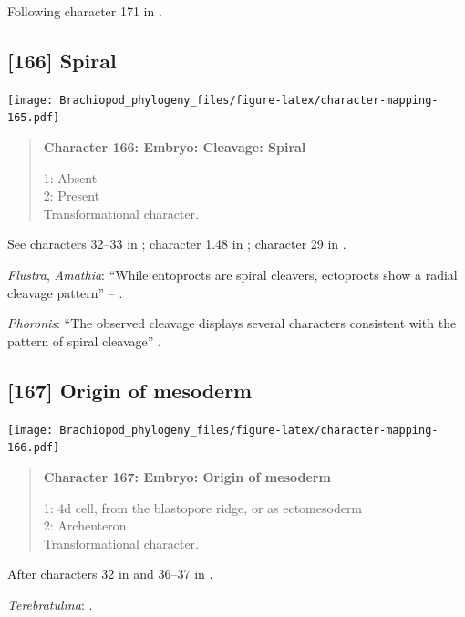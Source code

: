 \documentclass[openany]{book}
\begin{document}
Following character 171 in \citet{Giribet2002}.

\subsection*{{[}166{]} Spiral}\label{spiral}

\texttt{[image: Brachiopod\_phylogeny\_files/figure-latex/character-mapping-165.pdf]}

\begin{quote}
\textbf{Character 166: Embryo: Cleavage: Spiral}

1: Absent\\
2: Present\\
Transformational character.
\end{quote}

See characters 32--33 in \citet{Haszprunar1996}; character 1.48 in
\citet{SPS1996}; character 29 in \citet{Glenner2004}.

\hypertarget{Amathia-coding-166}{}
\emph{Flustra}, \emph{Amathia}: ``While entoprocts are spiral cleavers,
ectoprocts show a radial cleavage pattern'' -- \citet{Fuchs2008}.

\hypertarget{Phoronis-coding-166}{}
\emph{Phoronis}: ``The observed cleavage displays several characters
consistent with the pattern of spiral cleavage''
\citep{Pennerstorfer2012}.

\subsection*{{[}167{]} Origin of mesoderm}\label{origin-of-mesoderm}

\texttt{[image: Brachiopod\_phylogeny\_files/figure-latex/character-mapping-166.pdf]}

\begin{quote}
\textbf{Character 167: Embryo: Origin of mesoderm}

1: 4d cell, from the blastopore ridge, or as ectomesoderm\\
2: Archenteron\\
Transformational character.
\end{quote}

After characters 32 in \citet{Grobe2007} and 36--37 in
\citet{Glenner2004}.

\hypertarget{Terebratulina-coding-167}{}
\emph{Terebratulina}: \citet{Williams1997Introduction}.
\end{document}
